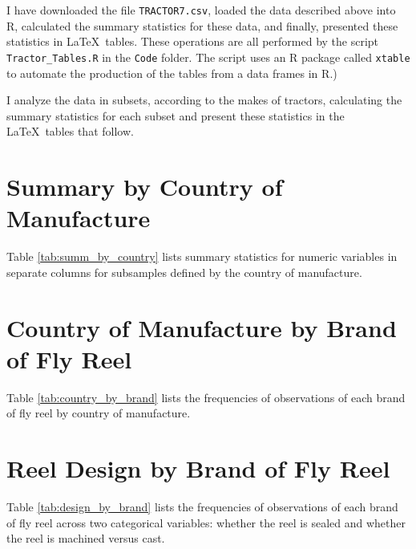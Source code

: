 \documentclass[11pt]{article}
\begin{document}
\bigskip
\noindent
I have downloaded the file {\tt TRACTOR7.csv}, 
loaded the data described above into 
\textsf{R}, 
calculated the summary statistics for these data, 
and finally, presented 
these statistics in \LaTeX\ tables.
These operations are all performed by the script 
{\tt Tractor\_Tables.R} in the {\tt Code} folder. 
The script uses an \textsf{R} package called {\tt xtable} 
to automate the
production of the tables from a data frames in \textsf{R}.)

\medskip
\noindent
I analyze the data in subsets, according to the makes of tractors, 
calculating the summary statistics for each subset and present these 
statistics in the \LaTeX\ tables that follow.

\vfill


\pagebreak
\section{Summary by Country of Manufacture}

Table \ref{tab:summ_by_country} lists summary statistics for numeric variables
in separate columns for subsamples defined by the country of manufacture. 




\pagebreak
\section{Country of Manufacture by Brand of Fly Reel}

Table \ref{tab:country_by_brand} lists the frequencies of observations of 
each brand of fly reel by country of manufacture. 



\pagebreak
\section{Reel Design by Brand of Fly Reel}

Table \ref{tab:design_by_brand} lists the frequencies of observations of 
each brand of fly reel across two categorical variables:
whether the reel is sealed
and whether the reel is machined versus cast. 





\end{document}
